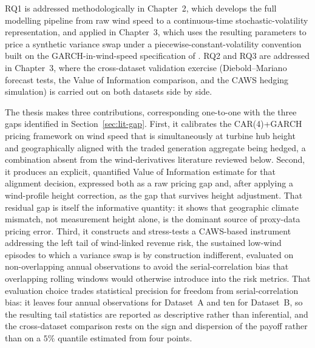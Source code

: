 \documentclass[11pt, a4paper, twoside]{article}
\begin{document}
RQ1 is addressed methodologically in Chapter~2, which develops the full modelling pipeline from raw wind speed to a continuous-time stochastic-volatility representation, and applied in Chapter~3, which uses the resulting parameters to price a synthetic variance swap under a piecewise-constant-volatility convention built on the GARCH-in-wind-speed specification of \citet{Tol1997}. RQ2 and RQ3 are addressed in Chapter~3, where the cross-dataset validation exercise (Diebold--Mariano forecast tests, the Value of Information comparison, and the CAWS hedging simulation) is carried out on both datasets side by side.

The thesis makes three contributions, corresponding one-to-one with the three gaps identified in Section~\ref{sec:lit-gap}. First, it calibrates the CAR(4)+GARCH pricing framework on wind speed that is simultaneously at turbine hub height and geographically aligned with the traded generation aggregate being hedged, a combination absent from the wind-derivatives literature reviewed below. Second, it produces an explicit, quantified Value of Information estimate for that alignment decision, expressed both as a raw pricing gap and, after applying a wind-profile height correction, as the gap that survives height adjustment. That residual gap is itself the informative quantity: it shows that geographic climate mismatch, not measurement height alone, is the dominant source of proxy-data pricing error. Third, it constructs and stress-tests a CAWS-based instrument addressing the left tail of wind-linked revenue risk, the sustained low-wind episodes to which a variance swap is by construction indifferent, evaluated on non-overlapping annual observations to avoid the serial-correlation bias that overlapping rolling windows would otherwise introduce into the risk metrics. That evaluation choice trades statistical precision for freedom from serial-correlation bias: it leaves four annual observations for Dataset~A and ten for Dataset~B, so the resulting tail statistics are reported as descriptive rather than inferential, and the cross-dataset comparison rests on the sign and dispersion of the payoff rather than on a $5\%$ quantile estimated from four points.
\end{document}

